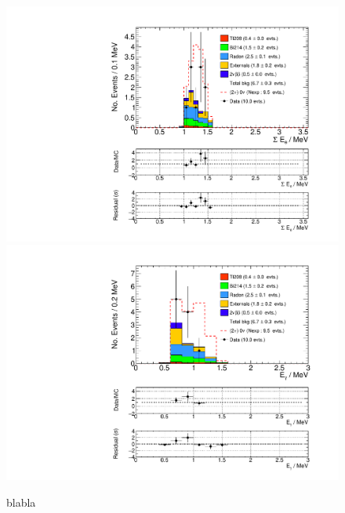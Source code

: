 \documentclass[main.tex]{subfiles}
\begin{document}
\begin{figure} [h!]
\begin{center}
\includegraphics[scale=0.5]{pictures/FinalResults/bb0nu2/150precut/SEe_bb0nu2.pdf}
\includegraphics[scale=0.5]{pictures/FinalResults/bb0nu2/150precut/Eg_bb0nu2.pdf}
\end{center}
\caption{blabla}
\label{plot:SEeAndEg250bb0nu2Precut}
\end{figure}
\end{document}
